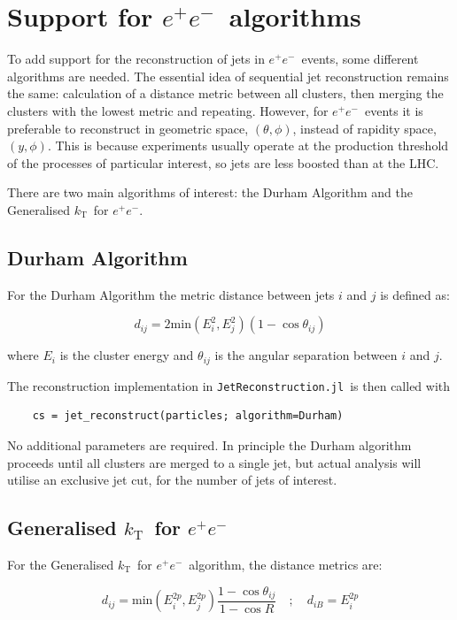 \documentclass{webofc}
\newcommand{\kt}{${k}_\text{T}$}
\newcommand{\JR}{\texttt{JetReconstruction.jl}}
\newcommand{\ee}{$e^+e^-$}
\begin{document}
\section{Support for \ee\ algorithms}
\label{sec:ee}

To add support for the reconstruction of jets in \ee\ events, some different
algorithms are needed. The essential idea of sequential jet reconstruction
remains the same: calculation of a distance metric between all clusters, then
merging the clusters with the lowest metric and repeating. However, for \ee\
events it is preferable to reconstruct in geometric space, $(\theta, \phi)$,
instead of rapidity space, $(y, \phi)$. This is because experiments usually
operate at the production threshold of the processes of particular interest, so
jets are less boosted than at the LHC.

There are two main algorithms of interest: the Durham Algorithm and the
Generalised \kt\ for \ee.

\subsection{Durham Algorithm}
\label{sec:durham}

For the Durham Algorithm the metric distance between jets $i$ and $j$ is defined as:

$$
d_{ij} = 2 \text{min}(E_i^2, E_j^2) (1 - \cos \theta_{ij})
$$

where $E_{i}$ is the cluster energy and $\theta_{ij}$ is the angular separation between $i$ and $j$.

The reconstruction implementation in \JR\ is then called with

\begin{verbatim}
    cs = jet_reconstruct(particles; algorithm=Durham)
\end{verbatim}

No additional parameters are required. In principle the Durham algorithm
proceeds until all clusters are merged to a single jet, but actual analysis will
utilise an exclusive jet cut, for the number of jets of interest.

\subsection{Generalised \kt\ for \ee}
\label{sec:getktee}

For the Generalised \kt\ for \ee\ algorithm, the distance metrics are:

$$
d_{ij} = \text{min}(E_i^{2p}, E_j^{2p}) \frac{1 - \cos \theta_{ij}}{1 - \cos R}
\quad ; \quad
d_{iB} = E_i^{2p}
$$
\end{document}
